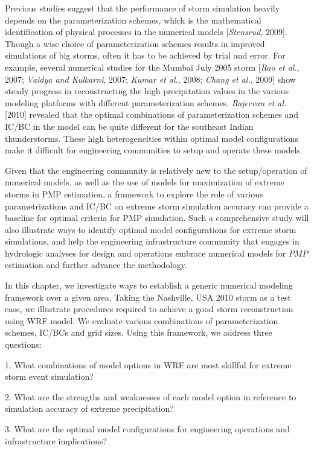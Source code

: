 Previous studies suggest that the performance of storm simulation heavily depends on the parameterization schemes, which is the mathematical identification of physical processes in the numerical models [\textit{Stensrud}, 2009]. Though a wise choice of parameterization schemes results in improved simulations of big storms, often it has to be achieved by trial and error. For example, several numerical studies for the Mumbai July 2005 storm [\textit{Rao et al.}, 2007; \textit{Vaidya and Kulkarni}, 2007; \textit{Kumar et al.}, 2008; \textit{Chang et al.}, 2009] show steady progress in reconstructing the high precipitation values in the various modeling platforms with different parameterization schemes. \textit{Rajeevan et al.} [2010] revealed that the optimal combinations of parameterization schemes and IC/BC in the model can be quite different for the southeast Indian thunderstorms. These high heterogeneities within optimal model configurations make it difficult for engineering communities to setup and operate these models.

Given that the engineering community is relatively new to the setup/operation of numerical models, as well as the use of models for maximization of extreme storms in PMP estimation, a framework to explore the role of various parametrizations and IC/BC on extreme storm simulation accuracy can provide a baseline for optimal criteria for PMP simulation. Such a comprehensive study will also illustrate ways to identify optimal model configurations for extreme storm simulations, and help the engineering infrastructure community that engages in hydrologic analyses for design and operations embrace numerical models for $PMP$ estimation and further advance the methodology.

In this chapter, we investigate ways to establish a generic numerical modeling framework over a given area. Taking the Nashville, USA 2010 storm as a test case, we illustrate procedures required to achieve a good storm reconstruction using WRF model. We evaluate various combinations of parameterization schemes, IC/BCs and grid sizes. Using this framework, we address three questions:

1. What combinations of model options in WRF are most skillful for extreme storm event simulation?

2. What are the strengths and weaknesses of each model option in reference to simulation accuracy of extreme precipitation? 

3. What are the optimal model configurations for engineering operations and infrastructure implications?
 
